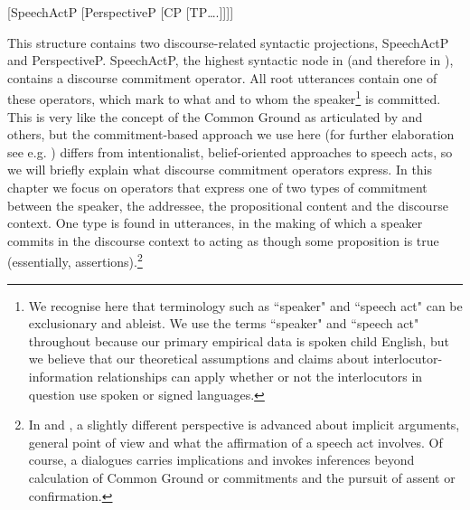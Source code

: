\documentclass[output=paper,colorlinks,citecolor=brown]{langscibook}
\begin{document}
\ea \label{intro:structure}
[SpeechActP [PerspectiveP [CP [TP….]]]] 
\z

This structure contains two discourse-related syntactic projections, Speech\-ActP and PerspectiveP. SpeechActP, the highest syntactic node in  (and therefore in ), contains a discourse commitment operator. All root utterances contain one of these operators, which mark to what and to whom the speaker\footnote{We recognise here that terminology such as ``speaker" and ``speech act" can be exclusionary and ableist. We use the terms ``speaker" and ``speech act" throughout because our primary empirical data is spoken child English, but we believe that our theoretical assumptions and claims about interlocutor-information relationships can apply whether or not the interlocutors in question use spoken or signed languages.} is committed. This is very like the concept of the Common Ground as articulated by \citet{stalnaker1979, stalnaker2002, gunlogson2001, gunlogson2008} and others, but the commitment-based approach we use here (for further elaboration see e.g. \citealt{krifka2015SALT,geurts2019}) differs from intentionalist, belief-oriented approaches to speech acts, so we will briefly explain what discourse commitment operators express. In this chapter we focus on operators that express one of two types of commitment between the speaker, the addressee, the propositional content and the discourse context. One type is found in utterances, in the making of which a speaker commits in the discourse context to acting as though some proposition is true (essentially, assertions).\footnote{In \citet{guroeper2011} and \citet{Roeper2016}, a slightly different perspective is advanced about implicit arguments, general point of view and what the affirmation of a speech act involves. Of course, a dialogues carries implications and invokes inferences beyond calculation of Common Ground or commitments and the pursuit of assent or confirmation.}
\end{document}

